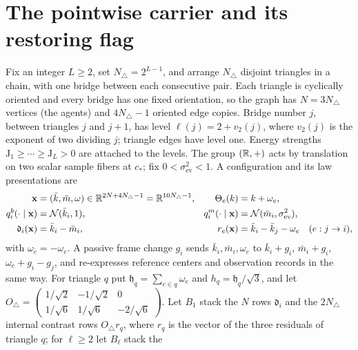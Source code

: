 \section{The pointwise carrier and its restoring flag}
\label{sec:rg-formation-carrier}

Fix an integer \(L\ge2\), set \(N_\triangle=2^{L-1}\), and arrange
\(N_\triangle\) disjoint triangles in a chain, with one bridge between each
consecutive pair. Each triangle is cyclically oriented and every bridge has
one fixed orientation, so the graph has \(N=3N_\triangle\) vertices (the
agents) and \(4N_\triangle-1\) oriented edge copies. Bridge number \(j\),
between triangles \(j\) and \(j+1\), has level \(\ell(j)=2+v_2(j)\), where
\(v_2(j)\) is the exponent of two dividing \(j\); triangle edges have level
one. Energy strengths \(\mathrm J_1\ge\cdots\ge\mathrm J_L>0\) are attached to
the levels. The group \((\mathbb R,+)\) acts by translation on two scalar sample
fibers at \(c_*\); fix \(0<\sigma^2_{\mathrm{ev}}<1\). A configuration and its
law presentations are
\begin{equation}
\begin{aligned}
\mathbf x&=(\bar k,\bar m,\omega)\in\mathbb R^{2N+4N_\triangle-1}=\mathbb R^{10N_\triangle-1},&
\Theta_e(k)&=k+\omega_e,\\
q_i^b(\cdot\mid\mathbf x)&=\mathcal N(\bar k_i,1),&
q_i^m(\cdot\mid\mathbf x)&=\mathcal N(\bar m_i,\sigma^2_{\mathrm{ev}}),\\
\mathfrak d_i(\mathbf x)&=\bar k_i-\bar m_i,&
r_e(\mathbf x)&=\bar k_i-\bar k_j-\omega_e\quad(e:j\to i),
\end{aligned}
\label{eq:rg-formation-configuration}
\end{equation}
with \(\omega_{\bar e}=-\omega_e\). A passive frame change \(g_i\) sends
\(\bar k_i,\bar m_i,\omega_e\) to \(\bar k_i+g_i\), \(\bar m_i+g_i\),
\(\omega_e+g_i-g_j\), and re-expresses reference centers and observation
records in the same way. For triangle \(q\) put
\(\mathfrak h_q=\sum_{e\in q}\omega_e\) and \(h_q=\mathfrak h_q/\sqrt3\), and
let
\(O_\triangle=\begin{pmatrix}1/\sqrt2&-1/\sqrt2&0\\1/\sqrt6&1/\sqrt6&-2/\sqrt6\end{pmatrix}\).
Let \(B_1\) stack the \(N\) rows \(\mathfrak d_i\) and the \(2N_\triangle\)
internal contrast rows \(O_\triangle r_q\), where \(r_q\) is the vector of the
three residuals of triangle \(q\); for \(\ell\ge2\) let \(B_\ell\) stack the
